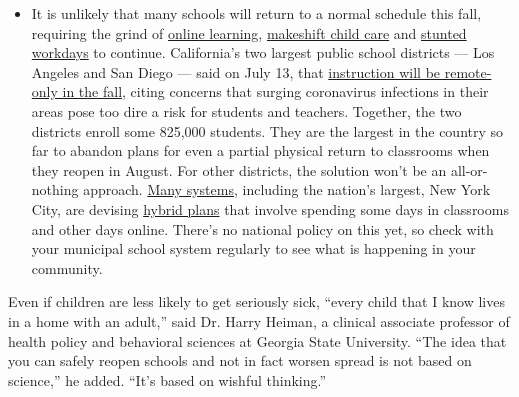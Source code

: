 \begin{itemize}
  \begin{itemize}
  \tightlist
  \item
    It is unlikely that many schools will return to a normal schedule
    this fall, requiring the grind of
    \href{https://www.nytimes.com/2020/06/05/us/coronavirus-education-lost-learning.html?action=click\&pgtype=Article\&state=default\&region=MAIN_CONTENT_3\&context=storylines_faq}{online
    learning},
    \href{https://www.nytimes.com/2020/05/29/us/coronavirus-child-care-centers.html?action=click\&pgtype=Article\&state=default\&region=MAIN_CONTENT_3\&context=storylines_faq}{makeshift
    child care} and
    \href{https://www.nytimes.com/2020/06/03/business/economy/coronavirus-working-women.html?action=click\&pgtype=Article\&state=default\&region=MAIN_CONTENT_3\&context=storylines_faq}{stunted
    workdays} to continue. California's two largest public school
    districts --- Los Angeles and San Diego --- said on July 13, that
    \href{https://www.nytimes.com/2020/07/13/us/lausd-san-diego-school-reopening.html?action=click\&pgtype=Article\&state=default\&region=MAIN_CONTENT_3\&context=storylines_faq}{instruction
    will be remote-only in the fall}, citing concerns that surging
    coronavirus infections in their areas pose too dire a risk for
    students and teachers. Together, the two districts enroll some
    825,000 students. They are the largest in the country so far to
    abandon plans for even a partial physical return to classrooms when
    they reopen in August. For other districts, the solution won't be an
    all-or-nothing approach.
    \href{https://bioethics.jhu.edu/research-and-outreach/projects/eschool-initiative/school-policy-tracker/}{Many
    systems}, including the nation's largest, New York City, are
    devising
    \href{https://www.nytimes.com/2020/06/26/us/coronavirus-schools-reopen-fall.html?action=click\&pgtype=Article\&state=default\&region=MAIN_CONTENT_3\&context=storylines_faq}{hybrid
    plans} that involve spending some days in classrooms and other days
    online. There's no national policy on this yet, so check with your
    municipal school system regularly to see what is happening in your
    community.
  \end{itemize}
\end{itemize}

Even if children are less likely to get seriously sick, ``every child
that I know lives in a home with an adult,'' said Dr. Harry Heiman, a
clinical associate professor of health policy and behavioral sciences at
Georgia State University. ``The idea that you can safely reopen schools
and not in fact worsen spread is not based on science,'' he added.
``It's based on wishful thinking.''

